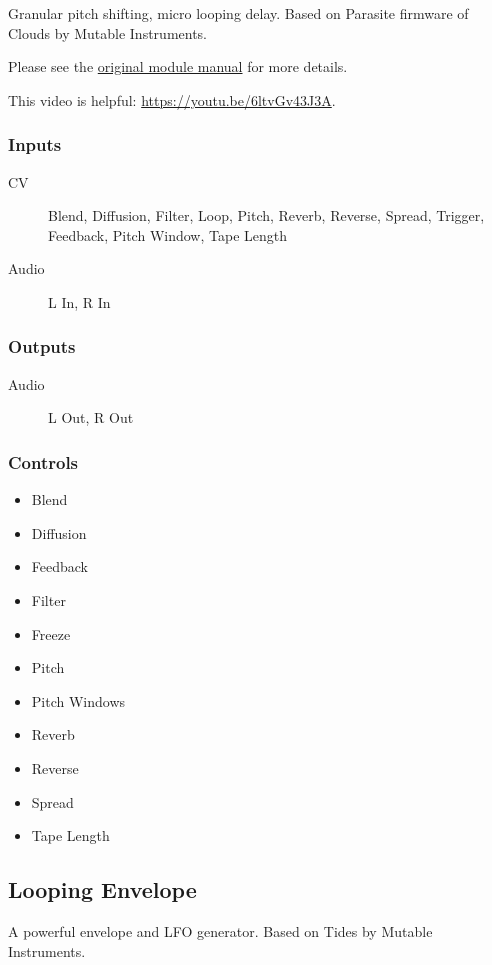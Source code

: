 Granular pitch shifting, micro looping delay. Based on Parasite firmware of Clouds by Mutable Instruments.



Please see the \href{https://mqtthiqs.github.io/parasites/clouds.html}{original module manual} for more details.

This video is helpful: \url{https://youtu.be/6ltvGv43J3A}.

\subsubsection{Inputs}
\begin{description}
\item [CV] Blend, Diffusion, Filter, Loop, Pitch, Reverb, Reverse, Spread, Trigger, Feedback, Pitch Window, Tape Length
\item [Audio] L In, R In
\end{description}

\subsubsection{Outputs}
\begin{description}
\item [Audio] L Out, R Out
\end{description}

\subsubsection{Controls}
\begin{itemize}
\item Blend
\item Diffusion
\item Feedback
\item Filter
\item Freeze
\item Pitch
\item Pitch Windows
\item Reverb
\item Reverse
\item Spread
\item Tape Length
\end{itemize}

\subsection{Looping Envelope}

A powerful envelope and LFO generator.
Based on Tides by Mutable Instruments. 

